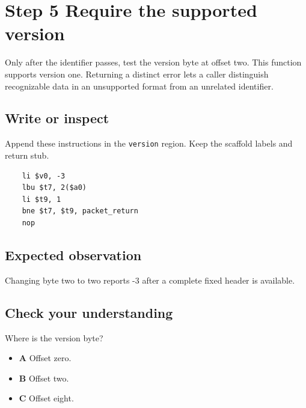 \section{Step 5 Require the supported version}\label{packet-s05}

Only after the identifier passes, test the version byte at offset two. This function supports version one. Returning a distinct error lets a caller distinguish recognizable data in an unsupported format from an unrelated identifier.

\subsection{Write or inspect}
Append these instructions in the \texttt{version} region. Keep the scaffold labels and return stub.

\begin{verbatim}
    li $v0, -3
    lbu $t7, 2($a0)
    li $t9, 1
    bne $t7, $t9, packet_return
    nop
\end{verbatim}

\subsection{Expected observation}
Changing byte two to two reports -3 after a complete fixed header is available.

\subsection{Check your understanding}
Where is the version byte?

\begin{itemize}
  \item \textbf{A} Offset zero.
  \item \textbf{B} Offset two.
  \item \textbf{C} Offset eight.
\end{itemize}
